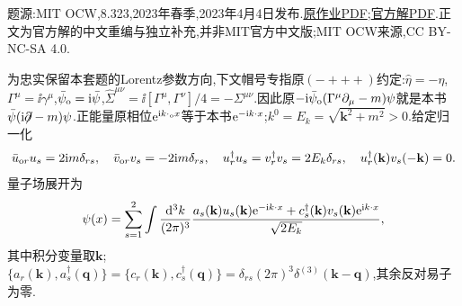 题源:MIT OCW,8.323,2023年春季,2023年4月4日发布.\href{https://ocw.mit.edu/courses/8-323-relativistic-quantum-field-theory-i-spring-2023/mit8_323_s23_pset08.pdf}{原作业PDF};\href{https://ocw.mit.edu/courses/8-323-relativistic-quantum-field-theory-i-spring-2023/mit8_323_s23_pset_08sol.pdf}{官方解PDF}.正文为官方解的中文重编与独立补充,并非MIT官方中文版;MIT OCW来源,CC BY-NC-SA 4.0.

为忠实保留本套题的Lorentz参数方向,下文帽号专指原$(-+++)$约定:$\widehat\eta=-\eta$,$\Gamma^\mu=\ii\gamma^\mu$,$\bar\psi_{\rm o}=\mathrm i\bar\psi$,$\widehat\Sigma^{\mu\nu}=\ii[\Gamma^\mu,\Gamma^\nu]/4=-\Sigma^{\mu\nu}$.因此原$-\mathrm i\bar\psi_{\rm o}(\Gamma^\mu\partial_\mu-m)\psi$就是本书$\bar\psi(\mathrm i\mathord{\not\mathrel{\partial}}-m)\psi$.正能量原相位$\mathrm e^{\mathrm i k\cdot_{\rm o}x}$等于本书$\mathrm e^{-\mathrm i k\cdot x}$;$k^0=E_k=\sqrt{\mathbf k^2+m^2}>0$.给定归一化
\[
 \bar u_{{\rm o}r}u_s=2\mathrm i m\delta_{rs},\quad
 \bar v_{{\rm o}r}v_s=-2\mathrm i m\delta_{rs},\quad
 u_r^\dagger u_s=v_r^\dagger v_s=2E_k\delta_{rs},\quad
 u_r^\dagger(\mathbf k)v_s(-\mathbf k)=0.
\]
量子场展开为
\[
 \psi(x)=\sum_{s=1}^2\int\frac{\mathrm d^3k}{(2\pi)^3}\frac{a_s(\mathbf k)u_s(\mathbf k)\mathrm e^{-\mathrm i k\cdot x}+c_s^\dagger(\mathbf k)v_s(\mathbf k)\mathrm e^{\mathrm i k\cdot x}}{\sqrt{2E_k}},
\]
其中积分变量取$\mathbf k$;$\{a_r(\mathbf k),a_s^\dagger(\mathbf q)\}=\{c_r(\mathbf k),c_s^\dagger(\mathbf q)\}=\delta_{rs}(2\pi)^3\delta^{(3)}(\mathbf k-\mathbf q)$,其余反对易子为零.

